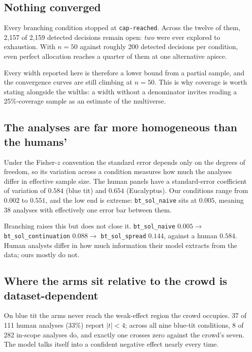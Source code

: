 \documentclass{article}
\begin{document}
\subsection{Nothing converged}
\label{sec:results-convergence}

Every branching condition stopped at \texttt{cap-reached}. Across the twelve of
them, 2{,}157 of 2{,}159 detected decisions remain open: \emph{two} were ever
explored to exhaustion. With $n = 50$ against roughly 200 detected decisions per
condition, even perfect allocation reaches a quarter of them at one alternative
apiece.

Every width reported here is therefore a lower bound from a partial sample, and
the convergence curves are still climbing at $n = 50$. This is why coverage is
worth stating alongside the widths: a width without a denominator invites
reading a 25\%-coverage sample as an estimate of the multiverse.

\subsection{The analyses are far more homogeneous than the humans'}
\label{sec:results-homogeneity}

Under the Fisher-$z$ convention the standard error depends only on the degrees of
freedom, so its variation across a condition measures how much the analyses
differ in effective sample size. The human panels have a standard-error
coefficient of variation of $0.584$ (blue tit) and $0.654$ (Eucalyptus). Our
conditions range from $0.002$ to $0.551$, and the low end is extreme:
\texttt{bt\_sol\_naive} sits at $0.005$, meaning 38 analyses with effectively
one error bar between them.

Branching raises this but does not close it. \texttt{bt\_sol\_naive} $0.005 \to$
\texttt{bt\_sol\_continuation} $0.088 \to$ \texttt{bt\_sol\_spread} $0.144$,
against a human $0.584$. Human analysts differ in how much information their
model extracts from the data; ours mostly do not.

\subsection{Where the arms sit relative to the crowd is dataset-dependent}
\label{sec:results-location}

On blue tit the arms never reach the weak-effect region the crowd occupies. 37
of 111 human analyses (33\%) report $|t| < 4$; across all nine blue-tit
conditions, 8 of 282 in-scope analyses do, and exactly one crosses zero against
the crowd's seven. The model talks itself into a confident negative effect
nearly every time.
\end{document}
